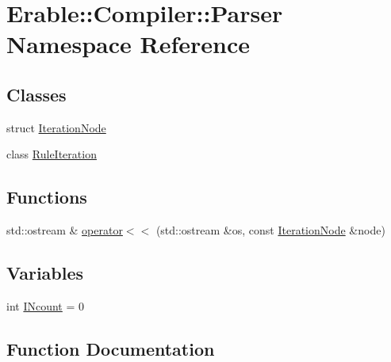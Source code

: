 \hypertarget{namespace_erable_1_1_compiler_1_1_parser}{}\section{Erable\+::Compiler\+::Parser Namespace Reference}
\label{namespace_erable_1_1_compiler_1_1_parser}
\subsection*{Classes}
\begin{DoxyCompactItemize}
\item 
struct \mbox{\hyperlink{struct_erable_1_1_compiler_1_1_parser_1_1_iteration_node}{Iteration\+Node}}
\item 
class \mbox{\hyperlink{class_erable_1_1_compiler_1_1_parser_1_1_rule_iteration}{Rule\+Iteration}}
\end{DoxyCompactItemize}
\subsection*{Functions}
\begin{DoxyCompactItemize}
\item 
std\+::ostream \& \mbox{\hyperlink{namespace_erable_1_1_compiler_1_1_parser_a3e8e228e48e310b1a0c646f13eae95e6}{operator$<$$<$}} (std\+::ostream \&os, const \mbox{\hyperlink{struct_erable_1_1_compiler_1_1_parser_1_1_iteration_node}{Iteration\+Node}} \&node)
\end{DoxyCompactItemize}
\subsection*{Variables}
\begin{DoxyCompactItemize}
\item 
int \mbox{\hyperlink{namespace_erable_1_1_compiler_1_1_parser_a5260f4c5af0518e9d815d1118e7c4350}{I\+Ncount}} = 0
\end{DoxyCompactItemize}


\subsection{Function Documentation}
\mbox{\label{namespace_erable_1_1_compiler_1_1_parser_a3e8e228e48e310b1a0c646f13eae95e6}} 
